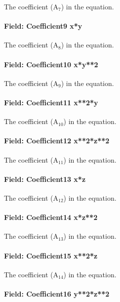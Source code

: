 The coefficient (A\(_{7}\)) in the equation.

\paragraph{Field: Coefficient9 x*y}\label{field-coefficient9-xy}

The coefficient (A\(_{8}\)) in the equation.

\paragraph{Field: Coefficient10 x*y**2}\label{field-coefficient10-xy2-1}

The coefficient (A\(_{9}\)) in the equation.

\paragraph{Field: Coefficient11 x**2*y}\label{field-coefficient11-x2y}

The coefficient (A\(_{10}\)) in the equation.

\paragraph{Field: Coefficient12 x**2*z**2}\label{field-coefficient12-x2z2}

The coefficient (A\(_{11}\)) in the equation.

\paragraph{Field: Coefficient13 x*z}\label{field-coefficient13-xz}

The coefficient (A\(_{12}\)) in the equation.

\paragraph{Field: Coefficient14 x*z**2}\label{field-coefficient14-xz2}

The coefficient (A\(_{13}\)) in the equation.

\paragraph{Field: Coefficient15 x**2*z}\label{field-coefficient15-x2z}

The coefficient (A\(_{14}\)) in the equation.

\paragraph{Field: Coefficient16 y**2*z**2}\label{field-coefficient16-y2z2}

